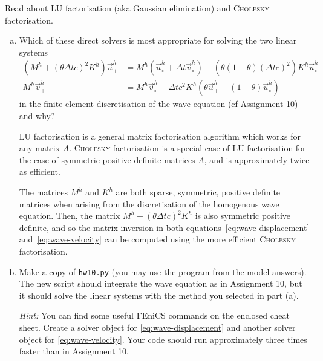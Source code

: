 Read about LU factorisation (aka Gaussian elimination) and \textsc{Cholesky} factorisation.
\begin{enumerate}[(a)]
\item Which of these direct solvers is most appropriate for solving the two linear systems
\begin{subequations}\label{eq:wave}
\begin{align}
\left(M^h + \left(\theta \Delta t c\right)^2 K^h\right) \vec{u}^h_+ &= M^h \left( \vec{u}^h_\circ + \Delta t \vec{v}^h_\circ\right) - \left( \theta\left(1-\theta\right) \left(\Delta t c\right)^2 \right)K^h \vec{u}^h_\circ\label{eq:wave-displacement}\\
M^h \vec{v}^h_+ &= M^h \vec{v}^h_\circ - \Delta t c^2 K^h \left( \theta \vec{u}^h_+ + \left(1-\theta\right) \vec{u}^h_\circ\right)\label{eq:wave-velocity}
\end{align}
\end{subequations}
in the finite-element discretisation of the wave equation (cf Assignment 10) and why?

\vspace{0.25cm}
\begin{solution}

LU factorisation is a general matrix factorisation algorithm which works for any matrix $A$. \textsc{Cholesky} factorisation is a special case of LU factorisation for the case of symmetric positive definite matrices $A$, and is approximately twice as efficient.

The matrices $M^h$ and $K^h$ are both sparse, symmetric, positive definite matrices when arising from the discretisation of the homogenous wave equation. Then, the matrix $M^h + \left(\theta \Delta t c\right)^2 K^h$ is also symmetric positive definite, and so the matrix inversion in both equations~\ref{eq:wave-displacement} and~\ref{eq:wave-velocity} can be computed using the more efficient \textsc{Cholesky} factorisation.

\end{solution}

\item Make a copy of \texttt{hw10.py} (you may use the program from the model answers). The new script should integrate the wave equation as in Assignment 10, but it should solve the linear systems with the method you selected in part (a).

\emph{Hint:} You can find some useful \textsf{FEniCS} commands on the enclosed cheat sheet. Create a solver object for \eqref{eq:wave-displacement} and another solver object for \eqref{eq:wave-velocity}. Your code should run approximately three times faster than in Assignment 10.

\vspace{0.25cm}
\begin{solution}
\end{solution}

\end{enumerate}

